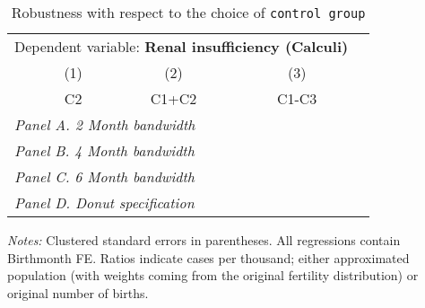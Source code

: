  \begin{table}[H] \begin{threeparttable} \centering \caption{Robustness with respect to the choice of \texttt{control group}} {\def\sym#1{\ifmmode^{#1}\else\(^{#1}\)\fi} \begin{tabular}{l*{4}{c}} \toprule \multicolumn{4}{c}{Dependent variable: \textbf{Renal insufficiency (Calculi)}} \\ \cmidrule(lr){2-4}
            &\multicolumn{1}{c}{(1)}&\multicolumn{1}{c}{(2)}&\multicolumn{1}{c}{(3)}\\
            &\multicolumn{1}{c}{C2}&\multicolumn{1}{c}{C1+C2}&\multicolumn{1}{c}{C1-C3}\\
\midrule
 \multicolumn{4}{l}{\emph{Panel A. 2 Month bandwidth}} \\    \midrule\multicolumn{4}{l}{\emph{Panel B. 4 Month bandwidth}} \\    \midrule\multicolumn{4}{l}{\emph{Panel C. 6 Month bandwidth}} \\    \midrule\multicolumn{4}{l}{\emph{Panel D. Donut specification}} \\    
\bottomrule \end{tabular} } \begin{tablenotes} \item \scriptsize \emph{Notes:} Clustered standard errors in parentheses. All regressions contain Birthmonth FE. Ratios indicate cases per thousand; either approximated population (with weights coming from the original fertility distribution) or original number of births. \end{tablenotes} \end{threeparttable} \end{table} 
